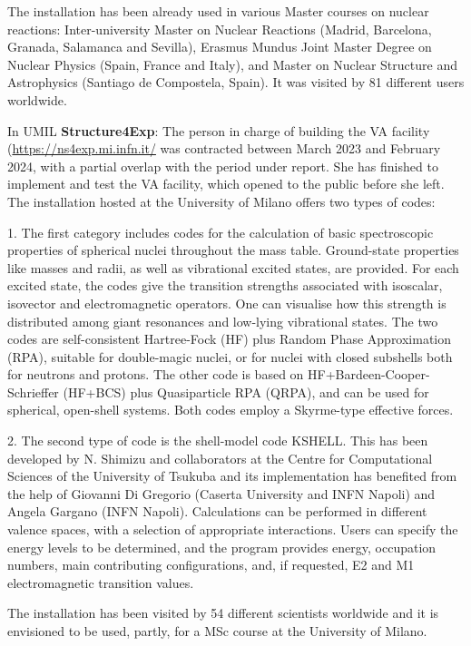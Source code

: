The installation has been already used in various Master courses on nuclear reactions: Inter-university Master on Nuclear Reactions (Madrid, Barcelona, Granada, Salamanca and Sevilla), Erasmus Mundus Joint Master Degree on Nuclear Physics (Spain, France and Italy), and Master on Nuclear Structure and Astrophysics (Santiago de Compostela, Spain). It was visited by 81 different users worldwide.

In UMIL \textbf{Structure4Exp}: The person in charge of building the VA facility (\url{https://ns4exp.mi.infn.it/} was contracted between March 2023 and February 2024, with a partial overlap with the period under report. She has finished to implement and test the VA facility, which opened to the public before she left.  The installation hosted at the University of Milano offers two types of codes:

1. The first category includes codes for the calculation of basic spectroscopic properties of spherical nuclei throughout the mass table. Ground-state properties like masses and radii, as well as vibrational excited states, are provided. For each excited state, the codes give the transition strengths associated with isoscalar, isovector and electromagnetic operators. One can visualise how this strength is distributed among giant resonances and low-lying vibrational states. The two codes are self-consistent Hartree-Fock (HF) plus Random Phase Approximation (RPA), suitable for double-magic nuclei, or for nuclei with closed subshells both for neutrons and protons. The other code is based on HF+Bardeen-Cooper-Schrieffer (HF+BCS) plus Quasiparticle RPA (QRPA), and can be used for spherical, open-shell systems. Both codes employ a Skyrme-type effective forces.

2. The second type of code is the shell-model code KSHELL. This has been developed by N. Shimizu and collaborators at the Centre for Computational Sciences of the University of Tsukuba and its implementation has benefited from the help of Giovanni Di Gregorio (Caserta University and INFN Napoli) and Angela Gargano (INFN Napoli). Calculations can be performed in different valence spaces, with a selection of appropriate interactions. Users can specify the energy levels to be determined, and the program provides energy, occupation numbers, main contributing configurations, and, if requested, E2 and M1 electromagnetic transition values. 

The installation has been visited by 54 different scientists worldwide  and it is envisioned to be used, partly, for a MSc course at the University of Milano.
